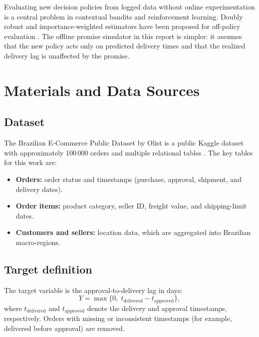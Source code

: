 \documentclass[10pt,twocolumn]{article}
\begin{document}
Evaluating new decision policies from logged data without online experimentation is a central problem in contextual bandits and reinforcement learning. Doubly robust and importance-weighted estimators have been proposed for off-policy evaluation \citep{dudik2011doubly,jiang2016doubly}. The offline promise simulator in this report is simpler: it assumes that the new policy acts only on predicted delivery times and that the realized delivery lag is unaffected by the promise.

\section{Materials and Data Sources}
\subsection{Dataset}
The Brazilian E-Commerce Public Dataset by Olist is a public Kaggle dataset with approximately 100\,000 orders and multiple relational tables \citep{olistdataset}. The key tables for this work are:
\begin{itemize}
  \item \textbf{Orders:} order status and timestamps (purchase, approval, shipment, and delivery dates).
  \item \textbf{Order items:} product category, seller ID, freight value, and shipping-limit dates.
  \item \textbf{Customers and sellers:} location data, which are aggregated into Brazilian macro-regions.
\end{itemize}

\subsection{Target definition}
The target variable is the approval-to-delivery lag in days:
\begin{equation}
  Y = \max\bigl\{0,\; t_{\text{delivered}} - t_{\text{approved}}\bigr\},
\end{equation}
where $t_{\text{delivered}}$ and $t_{\text{approved}}$ denote the delivery and approval timestamps, respectively. Orders with missing or inconsistent timestamps (for example, delivered before approval) are removed.
\end{document}
